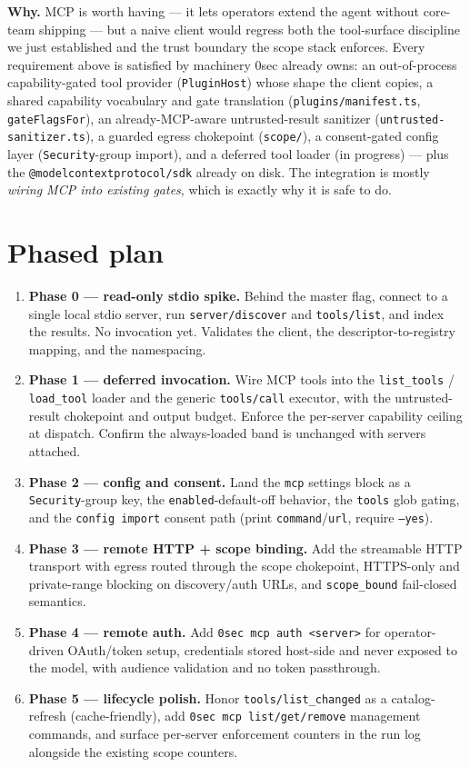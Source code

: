 \documentclass[11pt]{article}
\begin{document}
\textbf{Why.} MCP is worth having --- it lets operators extend the agent without
core-team shipping --- but a naive client would regress both the tool-surface
discipline we just established \cite{tool-curation} and the trust boundary the
scope stack enforces. Every requirement above is satisfied by machinery 0sec
already owns: an out-of-process capability-gated tool provider
(\texttt{PluginHost}) whose shape the client copies, a shared capability
vocabulary and gate translation (\texttt{plugins/manifest.ts},
\texttt{gateFlagsFor}), an already-MCP-aware untrusted-result sanitizer
(\texttt{untrusted-sanitizer.ts}), a guarded egress chokepoint (\texttt{scope/}),
a consent-gated config layer (\texttt{Security}-group import), and a deferred tool
loader (in progress) --- plus the \texttt{@modelcontextprotocol/sdk} already on
disk. The integration is mostly \emph{wiring MCP into existing gates}, which is
exactly why it is safe to do.

\section{Phased plan}

\begin{enumerate}[leftmargin=*]
  \item \textbf{Phase 0 --- read-only stdio spike.} Behind the master flag,
  connect to a single local stdio server, run \texttt{server/discover} and
  \texttt{tools/list}, and index the results. No invocation yet. Validates the
  client, the descriptor-to-registry mapping, and the namespacing.
  \item \textbf{Phase 1 --- deferred invocation.} Wire MCP tools into the
  \texttt{list\_tools} / \texttt{load\_tool} loader and the generic
  \texttt{tools/call} executor, with the untrusted-result chokepoint and output
  budget. Enforce the per-server capability ceiling at dispatch. Confirm the
  always-loaded band is unchanged with servers attached.
  \item \textbf{Phase 2 --- config and consent.} Land the \texttt{mcp}
  settings block as a \texttt{Security}-group key, the \texttt{enabled}-default-off
  behavior, the \texttt{tools} glob gating, and the \texttt{config import}
  consent path (print \texttt{command}/\texttt{url}, require \texttt{--yes}).
  \item \textbf{Phase 3 --- remote HTTP + scope binding.} Add the streamable
  HTTP transport with egress routed through the scope chokepoint, HTTPS-only and
  private-range blocking on discovery/auth URLs, and \texttt{scope\_bound}
  fail-closed semantics.
  \item \textbf{Phase 4 --- remote auth.} Add \texttt{0sec mcp auth <server>} for
  operator-driven OAuth/token setup, credentials stored host-side and never
  exposed to the model, with audience validation and no token passthrough.
  \item \textbf{Phase 5 --- lifecycle polish.} Honor \texttt{tools/list\_changed}
  as a catalog-refresh (cache-friendly), add \texttt{0sec mcp list/get/remove}
  management commands, and surface per-server enforcement counters in the run
  log alongside the existing scope counters.
\end{enumerate}
\end{document}
